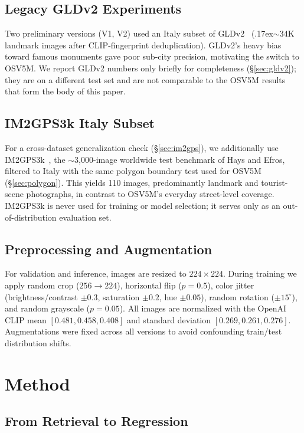 \documentclass[10pt,twocolumn,letterpaper]{article}
\begin{document}
\subsection{Legacy GLDv2 Experiments}

Two preliminary versions (V1, V2) used an Italy subset of GLDv2~\cite{gldv2}
(\raise.17ex\hbox{$\scriptstyle\sim$}34K landmark images after CLIP-fingerprint
deduplication). GLDv2's heavy bias toward famous monuments gave poor sub-city
precision, motivating the switch to OSV5M. We report GLDv2 numbers only briefly
for completeness (\S\ref{sec:gldv2}); they are on a different test set and are
not comparable to the OSV5M results that form the body of this paper.

\subsection{IM2GPS3k Italy Subset}
\label{sec:im2gps-dataset}

For a cross-dataset generalization check (\S\ref{sec:im2gps}), we additionally
use IM2GPS3k~\cite{im2gps}, the $\sim$3,000-image worldwide test benchmark of
Hays and Efros, filtered to Italy with the same polygon boundary test used for
OSV5M (\S\ref{sec:polygon}). This yields 110 images, predominantly landmark and
tourist-scene photographs, in contrast to OSV5M's everyday street-level
coverage. IM2GPS3k is never used for training or model selection; it serves
only as an out-of-distribution evaluation set.

\subsection{Preprocessing and Augmentation}

For validation and inference, images are resized to $224\times224$.
During training we apply random crop ($256\to224$), horizontal flip ($p=0.5$),
color jitter (brightness/contrast $\pm0.3$, saturation $\pm0.2$, hue $\pm0.05$),
random rotation ($\pm15^\circ$), and random grayscale ($p=0.05$).
All images are normalized with the OpenAI CLIP mean $[0.481, 0.458, 0.408]$ and
standard deviation $[0.269, 0.261, 0.276]$. Augmentations were fixed across all
versions to avoid confounding train/test distribution shifts.

\section{Method}
\label{sec:method}

\subsection{From Retrieval to Regression}
\end{document}
